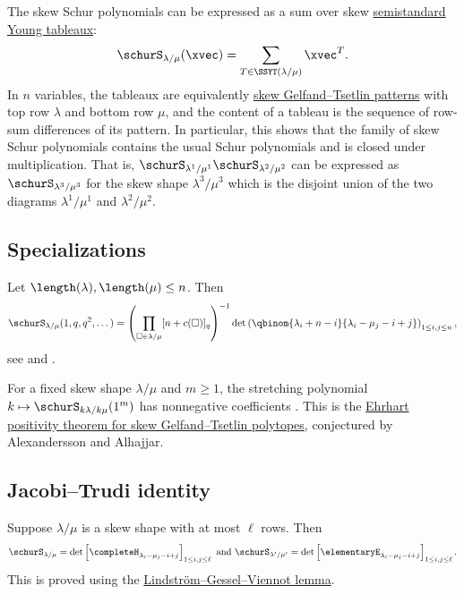 The skew Schur polynomials can be expressed as a sum over skew
\hyperref[prelimTableaux]{semistandard Young tableaux}:
\begin{equation*}
 \schurS_{\lambda/\mu}(\xvec) = \sum_{T \in \SSYT(\lambda/\mu)} \xvec^{T}.
\end{equation*}
In $n$ variables, the tableaux are equivalently
\hyperref[skewFlaggedGTPatterns]{skew Gelfand--Tsetlin patterns} with top
row $\lambda$ and bottom row $\mu$, and the content of a tableau is the
sequence of row-sum differences of its pattern.
In particular, this shows that the family of skew Schur polynomials
contains the usual Schur polynomials and is closed under multiplication.
That is, $\schurS_{\lambda^1/\mu^1}\schurS_{\lambda^2/\mu^2}$ can be
expressed as $\schurS_{\lambda^3/\mu^3}$ for the skew shape
$\lambda^3/\mu^3$ which is the disjoint union of the two diagrams
$\lambda^1/\mu^1$ and $\lambda^2/\mu^2$.


\subsection[skewSchurSpecializations]{Specializations}

Let $\length(\lambda), \length(\mu) \leq n$.
Then
\[
 \schurS_{\lambda/\mu}(1,q,q^2,\dotsc) =
 \left(\prod_{\square \in \lambda/\mu} [n+c(\square)]_q\right)^{-1}
 \det\left( \qbinom{\lambda_i + n-i}{\lambda_i - \mu_j-i+j}  \right)_{1 \leq i,j \leq n},
\]
see \cite[Exer.~102]{StanleyEC2} and \cite{ChenStanley2016}.

For a fixed skew shape $\lambda/\mu$ and $m\geq1$, the stretching polynomial
$k\mapsto\schurS_{k\lambda/k\mu}(1^m)$ has nonnegative coefficients
\cite[Thm.~3.5]{JochemkoMenon2026x}.  This is the
\hyperref[skewGTEhrhartPositivity]{Ehrhart positivity theorem for skew
Gelfand--Tsetlin polytopes}, conjectured by Alexandersson and Alhajjar.



\subsection[skewJacobiTrudi]{Jacobi--Trudi identity}

Suppose $\lambda/\mu$ is a skew shape with at most $\ell$ rows.
Then
\[
\schurS_{\lambda/\mu} = \det\left[ \completeH_{\lambda_i-\mu_j - i + j}  \right]_{1\leq i,j \leq \ell} \text{ and }
\schurS_{\lambda'/\mu'} = \det\left[ \elementaryE_{\lambda_i-\mu_j - i + j}  \right]_{1\leq i,j \leq \ell}.
\]
This is proved using the \hyperref[lgvLemma]{Lindström--Gessel--Viennot lemma}.


